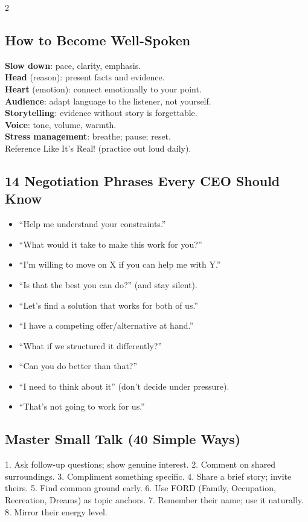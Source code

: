 \documentclass[10pt,a4paper]{article}
\begin{document}
\begin{multicols}{2}
\subsection{How to Become Well-Spoken}
\textbf{Slow down}: pace, clarity, emphasis.\\
\textbf{Head} (reason): present facts and evidence.\\
\textbf{Heart} (emotion): connect emotionally to your point.\\
\textbf{Audience}: adapt language to the listener, not yourself.\\
\textbf{Storytelling}: evidence without story is forgettable.\\
\textbf{Voice}: tone, volume, warmth.\\
\textbf{Stress management}: breathe; pause; reset.\\
Reference Like It's Real! (practice out loud daily).

\subsection{14 Negotiation Phrases Every CEO Should Know}
\begin{itemize}
\item ``Help me understand your constraints.''
\item ``What would it take to make this work for you?''
\item ``I'm willing to move on X if you can help me with Y.''
\item ``Is that the best you can do?'' (and stay silent).
\item ``Let's find a solution that works for both of us.''
\item ``I have a competing offer/alternative at hand.''
\item ``What if we structured it differently?''
\item ``Can you do better than that?''
\item ``I need to think about it'' (don't decide under pressure).
\item ``That's not going to work for us.''
\end{itemize}

\subsection{Master Small Talk (40 Simple Ways)}
1. Ask follow-up questions; show genuine interest.
2. Comment on shared surroundings.
3. Compliment something specific.
4. Share a brief story; invite theirs.
5. Find common ground early.
6. Use FORD (Family, Occupation, Recreation, Dreams) as topic anchors.
7. Remember their name; use it naturally.
8. Mirror their energy level.


\end{multicols}
\end{document}
